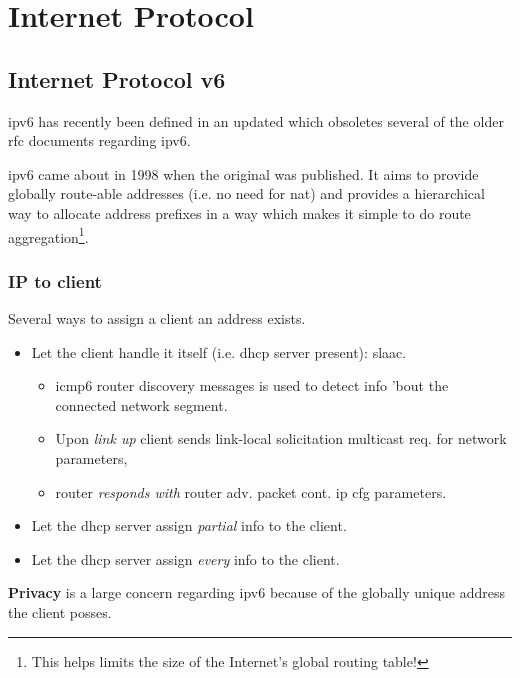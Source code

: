 \chapter[IP]{Internet Protocol}

\section[IPv6]{Internet Protocol v6}

\gls{ipv6} has recently been defined in an updated  which obsoletes several of the older \gls{rfc} documents regarding \gls{ipv6}.

\gls{ipv6} came about in 1998 when the original  was published. It aims to provide globally route-able addresses (i.e. no need for \gls{nat}) and provides a hierarchical way to allocate address prefixes in a way which makes it simple to do route aggregation\footnote{This helps limits the size of the Internet's global routing table!}.\cite{wiki:IPv6}


\subsection{IP to client}

Several ways to assign a client an address exists.
\begin{itemize}
    \item Let the client handle it itself (i.e. \gls{dhcp} server present): \gls{slaac}.
    \begin{itemize}
        \item \gls{icmp6} router discovery messages is used to detect info 'bout the connected network segment.
        \item Upon \textit{link up} client sends link-local solicitation multicast req. for network parameters,
        \item router \textit{responds with}  router adv. packet cont. \gls{ip} cfg parameters.
    \end{itemize}
    \item Let the \gls{dhcp} server assign \textit{partial} info to the client.
    \item Let the \gls{dhcp} server assign \textit{every} info to the client.
\end{itemize}

\textbf{Privacy} is a large concern regarding \gls{ipv6} because of the globally unique address the client posses.

